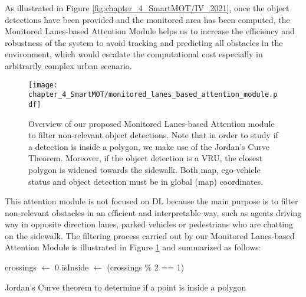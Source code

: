 As illustrated in Figure \ref{fig:chapter_4_SmartMOT/IV_2021}, once the object detections have been provided and the monitored area has been computed, the Monitored Lanes-based Attention Module helps us to increase the efficiency and robustness of the system to avoid tracking and predicting all obstacles in the environment, which would escalate the computational cost especially in arbitrarily complex urban scenario. 

\begin{figure}[h] 
	\centering
	\texttt{[image: chapter\_4\_SmartMOT/monitored\_lanes\_based\_attention\_module.pdf]}
	\captionsetup{justification=justified}
	\caption[Overview of our proposed Monitored Lanes-based Attention module to filter non-relevant object detections]{Overview of our proposed Monitored Lanes-based Attention module to filter non-relevant object detections. Note that in order to study if a detection is inside a polygon, we make use of the Jordan's Curve Theorem. Moreover, if the object detection is a \ac{VRU}, the closest polygon is widened towards the sidewalk. Both map, ego-vehicle status and object detection must be in global (map) coordinates.}
	\label{fig:chapter_4_SmartMOT/monitored_lanes_based_attention_module}
\end{figure}

This attention module is not focused on \ac{DL} because the main purpose is to filter non-relevant obstacles in an efficient and interpretable way, such as agents driving way in opposite direction lanes, parked vehicles or pedestrians who are chatting on the sidewalk. The filtering process carried out by our Monitored Lanes-based Attention Module is illustrated in Figure \ref{fig:chapter_4_SmartMOT/monitored_lanes_based_attention_module} and summarized as follows:

\begin{algorithm}[h]
	\SetAlgoLined
	crossings $\leftarrow$ 0\;
	isInside $\leftarrow$ (crossings \% 2 == 1)\;
	\;
	\caption{Jordan's Curve theorem to determine if a point is inside a polygon}
	\label{alg:4_jordan_curve_theorem}
\end{algorithm}

